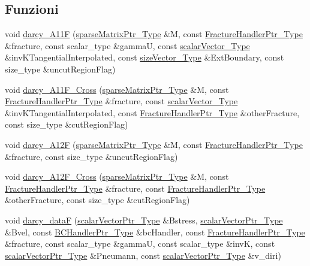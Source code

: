 \subsection*{Funzioni}
\begin{DoxyCompactItemize}
\item 
void \hyperlink{namespacegetfem_aba6f1b4f1d395aae3d96071cad4953a2}{darcy\-\_\-\-A11\-F} (\hyperlink{Core_8h_a87137a9501b38c724ac80bc955164bb7}{sparse\-Matrix\-Ptr\-\_\-\-Type} \&M, const \hyperlink{FractureHandler_8h_af23fb7a30aaff864bd42587af4f1e78a}{Fracture\-Handler\-Ptr\-\_\-\-Type} \&fracture, const scalar\-\_\-type \&gamma\-U, const \hyperlink{Core_8h_a4e75b5863535ba1dd79942de2846eff0}{scalar\-Vector\-\_\-\-Type} \&inv\-K\-Tangential\-Interpolated, const \hyperlink{Core_8h_a83c51913d041a5001e8683434c09857f}{size\-Vector\-\_\-\-Type} \&Ext\-Boundary, const size\-\_\-type \&uncut\-Region\-Flag)
\item 
void \hyperlink{namespacegetfem_a9b6ded8fe1019aa04e66d2047d0f29dd}{darcy\-\_\-\-A11\-F\-\_\-\-Cross} (\hyperlink{Core_8h_a87137a9501b38c724ac80bc955164bb7}{sparse\-Matrix\-Ptr\-\_\-\-Type} \&M, const \hyperlink{FractureHandler_8h_af23fb7a30aaff864bd42587af4f1e78a}{Fracture\-Handler\-Ptr\-\_\-\-Type} \&fracture, const \hyperlink{Core_8h_a4e75b5863535ba1dd79942de2846eff0}{scalar\-Vector\-\_\-\-Type} \&inv\-K\-Tangential\-Interpolated, const \hyperlink{FractureHandler_8h_af23fb7a30aaff864bd42587af4f1e78a}{Fracture\-Handler\-Ptr\-\_\-\-Type} \&other\-Fracture, const size\-\_\-type \&cut\-Region\-Flag)
\item 
void \hyperlink{namespacegetfem_ab62aa98cfcf55810e1518906202cbedc}{darcy\-\_\-\-A12\-F} (\hyperlink{Core_8h_a87137a9501b38c724ac80bc955164bb7}{sparse\-Matrix\-Ptr\-\_\-\-Type} \&M, const \hyperlink{FractureHandler_8h_af23fb7a30aaff864bd42587af4f1e78a}{Fracture\-Handler\-Ptr\-\_\-\-Type} \&fracture, const size\-\_\-type \&uncut\-Region\-Flag)
\item 
void \hyperlink{namespacegetfem_a88df6c0cb0765d5ab0fae27679cd30f4}{darcy\-\_\-\-A12\-F\-\_\-\-Cross} (\hyperlink{Core_8h_a87137a9501b38c724ac80bc955164bb7}{sparse\-Matrix\-Ptr\-\_\-\-Type} \&M, const \hyperlink{FractureHandler_8h_af23fb7a30aaff864bd42587af4f1e78a}{Fracture\-Handler\-Ptr\-\_\-\-Type} \&fracture, const \hyperlink{FractureHandler_8h_af23fb7a30aaff864bd42587af4f1e78a}{Fracture\-Handler\-Ptr\-\_\-\-Type} \&other\-Fracture, const size\-\_\-type \&cut\-Region\-Flag)
\item 
void \hyperlink{namespacegetfem_ad6e90b309c01f6b4fc91c9369cba376a}{darcy\-\_\-data\-F} (\hyperlink{Core_8h_ab09b6fa3c23db1b8c60456f8690c44a7}{scalar\-Vector\-Ptr\-\_\-\-Type} \&Bstress, \hyperlink{Core_8h_ab09b6fa3c23db1b8c60456f8690c44a7}{scalar\-Vector\-Ptr\-\_\-\-Type} \&Bvel, const \hyperlink{BCHandler_8h_aa175884cb453788647f17f2230a2a762}{B\-C\-Handler\-Ptr\-\_\-\-Type} \&bc\-Handler, const \hyperlink{FractureHandler_8h_af23fb7a30aaff864bd42587af4f1e78a}{Fracture\-Handler\-Ptr\-\_\-\-Type} \&fracture, const scalar\-\_\-type \&gamma\-U, const scalar\-\_\-type \&inv\-K, const \hyperlink{Core_8h_ab09b6fa3c23db1b8c60456f8690c44a7}{scalar\-Vector\-Ptr\-\_\-\-Type} \&Pneumann, const \hyperlink{Core_8h_ab09b6fa3c23db1b8c60456f8690c44a7}{scalar\-Vector\-Ptr\-\_\-\-Type} \&v\-\_\-diri)

\end{DoxyCompactItemize}
